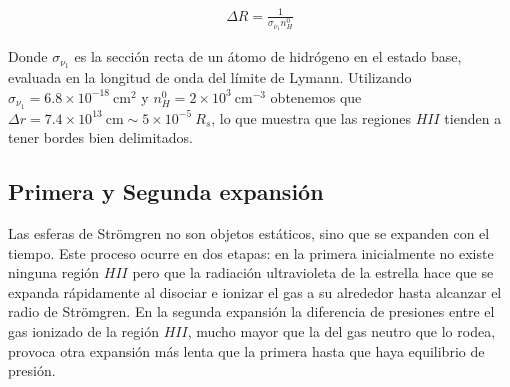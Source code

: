 \begin{align}
\Delta R = \frac{1}{\sigma_{\nu_1}n^0_H}  
\end{align}

Donde $\sigma_{\nu_1}$ es la sección recta de un átomo de hidrógeno en el estado base, evaluada en la longitud de onda del límite de Lymann. Utilizando $\sigma_{\nu_1} = 6.8\times 10^{-18}\mathrm{~cm^2}$ y $n^0_H = 2\times 10^{3}\mathrm{~cm^{-3}}$ obtenemos que $\Delta r = 7.4\times 10^{13}\mathrm{~cm} \sim 5\times 10^{-5}~R_s$, lo que muestra que las regiones $HII$ tienden a tener bordes bien delimitados.

\subsection{Primera y Segunda expansión}

Las esferas de Strömgren no son objetos estáticos, sino que se expanden con el tiempo. Este proceso ocurre en dos etapas: en la primera inicialmente no existe ninguna región $HII$ pero que la radiación ultravioleta de la estrella hace que se expanda rápidamente al disociar e ionizar el gas a su alrededor hasta alcanzar el radio de Strömgren. En la segunda expansión la diferencia de presiones entre el gas ionizado de la región $HII$, mucho mayor que la del gas neutro que lo rodea, provoca otra expansión más lenta que la primera hasta que haya equilibrio de presión.





